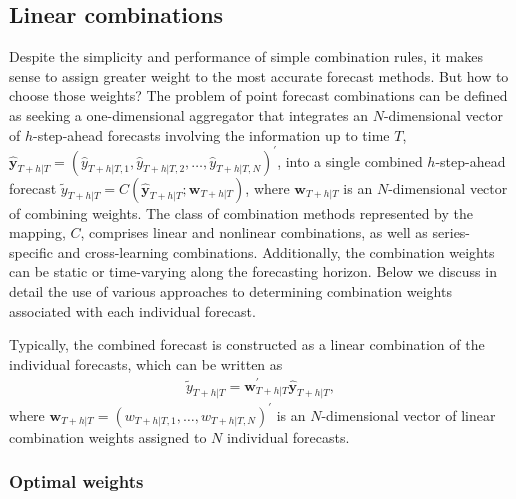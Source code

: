 \documentclass[11pt]{article}
\begin{document}
\subsection{Linear combinations}
\label{sec:linear_comb}

Despite the simplicity and performance of simple combination rules, it makes sense to assign greater weight to the most accurate forecast methods. But how to choose those weights? The problem of point forecast combinations can be defined as seeking a one-dimensional aggregator that integrates an $N$-dimensional vector of $h$-step-ahead forecasts involving the information up to time $T$, $\hat{\bm{y}}_{T+h|T}=\left(\hat{y}_{T+h|T, 1}, \hat{y}_{T+h|T, 2}, \dots, \hat{y}_{T+h|T, N}\right)^{\prime}$, into a single combined $h$-step-ahead forecast $\tilde{y}_{T+h|T}=C\left(\hat{\bm{y}}_{T+h|T} ; \bm{w}_{T+h|T}\right)$, where $\bm{w}_{T+h|T}$ is an $N$-dimensional vector of combining weights. The class of combination methods represented by the mapping, $C$, comprises linear and nonlinear combinations, as well as series-specific and cross-learning combinations. Additionally, the combination weights can be static or time-varying along the forecasting horizon. Below we discuss in detail the use of various approaches to determining combination weights associated with each individual forecast.

Typically, the combined forecast is constructed as a linear combination of the individual forecasts, which can be written as
\begin{align*}
  \tilde{y}_{T+h|T}=\bm{w}_{T+h|T}^{\prime} \hat{\bm{y}}_{T+h|T},
\end{align*}
where $\bm{w}_{T+h|T}=\left(w_{T+h|T, 1}, \dots, w_{T+h|T, N}\right)^{\prime}$ is an $N$-dimensional vector of linear combination weights assigned to $N$ individual forecasts.

\subsubsection*{Optimal weights}
\end{document}
